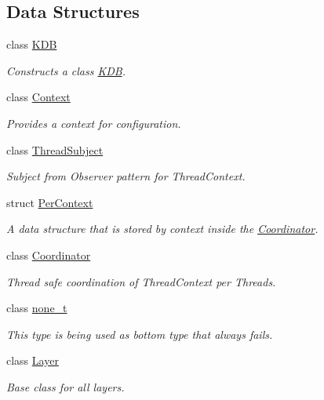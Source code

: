 \subsection*{Data Structures}
\begin{DoxyCompactItemize}
\item 
class \hyperlink{classkdb_1_1KDB}{K\-D\-B}
\begin{DoxyCompactList}\small\item\em Constructs a class \hyperlink{classkdb_1_1KDB}{K\-D\-B}.  \end{DoxyCompactList}\item 
class \hyperlink{classkdb_1_1Context}{Context}
\begin{DoxyCompactList}\small\item\em Provides a context for configuration. \end{DoxyCompactList}\item 
class \hyperlink{classkdb_1_1ThreadSubject}{Thread\-Subject}
\begin{DoxyCompactList}\small\item\em Subject from Observer pattern for Thread\-Context. \end{DoxyCompactList}\item 
struct \hyperlink{structkdb_1_1PerContext}{Per\-Context}
\begin{DoxyCompactList}\small\item\em A data structure that is stored by context inside the \hyperlink{classkdb_1_1Coordinator}{Coordinator}. \end{DoxyCompactList}\item 
class \hyperlink{classkdb_1_1Coordinator}{Coordinator}
\begin{DoxyCompactList}\small\item\em Thread safe coordination of Thread\-Context per Threads. \end{DoxyCompactList}\item 
class \hyperlink{classkdb_1_1none__t}{none\-\_\-t}
\begin{DoxyCompactList}\small\item\em This type is being used as bottom type that always fails. \end{DoxyCompactList}\item 
class \hyperlink{classkdb_1_1Layer}{Layer}
\begin{DoxyCompactList}\small\item\em Base class for all layers. \end{DoxyCompactList}\item 

\end{DoxyCompactItemize}
